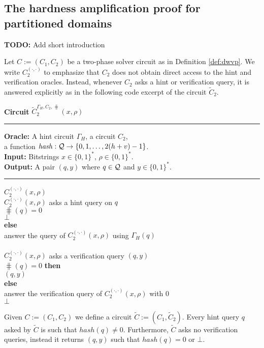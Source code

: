 %
\subsection{The hardness amplification proof for partitioned domains}
\label{st:amplification_proof}
\begin{todo}
  \textbf{TODO:} Add short introduction
\end{todo}

Let $C := (C_1, C_2)$ be a two-phase solver circuit as in Definition \ref{def:dwvp}.
We write $C_2^{(\cdot, \cdot)}$ to emphasize that $C_2$ does not obtain direct access to the hint and verification oracles.
Instead, whenever $C_2$ asks a hint or verification query, it is answered explicitly
as in the following code excerpt of the circuit $\widetilde{C}_2$.

\begin{codeblock}
  \textbf{Circuit} $\widetilde{C}_2^{\Gamma_H, C_2, \hash} (x, \rho)$
  \medskip \hrule
  \textbf{Oracle:} A hint circuit $\Gamma_H$, a circuit $C_2$, \\ \IndII a function $\operatorname{\mathit{hash}} : \mathcal{Q} \rightarrow \{0,1,\dots, 2(h+v)-1\}$. \\
  \textbf{Input:} Bitstrings $x \in \{0,1\}^{*}$, $\rho \in \{0,1\}^{*}$. \\
  \textbf{Output:} A pair $(q, y)$ where $q \in \mathcal{Q}$ and $y \in \{0,1\}^{*}$.
  \medskip\hrule
  \Run $C_2^{(\cdot, \cdot)}(x, \rho)$ \\
  \IndI \If $C_2^{(\cdot, \cdot)}(x, \rho)$ asks a hint query on $q$ \Then\\
  \IndII \If $\hash(q) = 0$ \Then\\
  \IndIII \Return $\bot$\\
  \IndII \textbf{else}\\
  \IndIII answer the query of $C_2^{(\cdot, \cdot)}(x, \rho)$ using $\Gamma_H(q)$\\
  \\
  \IndI \If $C_2^{(\cdot, \cdot)}(x, \rho)$ asks a verification query $(q, y)$ \Then \\
  \IndII \If $\hash(q) = 0 $ \textbf{then} \\
  \IndIII \Return $(q, y)$ \\
  \IndII \textbf{else} \\
  \IndIII answer the verification query of $C_2^{(\cdot, \cdot)}(x, \rho)$ with 0 \\
  \Return $\bot$
\end{codeblock}
%
Given $C := (C_1, C_2)$ we define a circuit $\widetilde{C} := (C_1, \widetilde{C}_2)$.
Every hint query $q$ asked by $\widetilde{C}$ is such that $hash(q) \neq 0$.
Furthermore, $\widetilde{C}$ asks no verification queries, instead it returns $(q,y)$ such that $hash(q) = 0$ or $\bot$.

